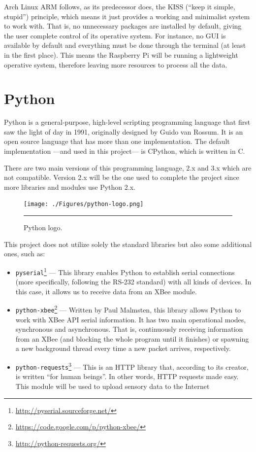 Arch Linux ARM follows, as its predecessor does, the KISS (``keep it simple, stupid'') principle, which means it just provides a working and minimalist system to work with. That is, no unnecessary packages are installed by default, giving the user complete control of its operative system. For instance, no GUI is available by default and everything must be done through the terminal (at least in the first place). This means the Raspberry Pi will be running a lightweight operative system, therefore leaving more resources to process all the data.


\section{Python}
\label{sec:whatispython}

Python is a general-purpose, high-level scripting programming language that first saw the light of day in 1991, originally designed by Guido van Rossum. It is an open source language that has more than one implementation. The default implementation ---and used in this project--- is CPython, which is written in C. 

There are two main versions of this programming language, 2.x and 3.x which are not compatible. Version 2.x will be the one used to complete the project since more libraries and modules use Python 2.x.

\begin{figure}[htbp]
    \centering
    \texttt{[image: ./Figures/python-logo.png]}
        \rule{35em}{0.5pt}
        \caption[Python logo]{Python logo.}
    \label{fig:pythonlogo}
\end{figure}

This project does not utilize solely the standard libraries but also some additional ones, such as:

\begin{itemize}
    \item \texttt{pyserial}\footnote{\url{http://pyserial.sourceforge.net/}} --- This library enables Python to establish serial connections (more specifically, following the RS-232 standard) with all kinds of devices. In this case, it allows us to receive data from an XBee\textregistered{} module.
    \item \texttt{python-xbee}\footnote{\url{https://code.google.com/p/python-xbee/}} --- Written by Paul Malmsten, this library allows Python to work with XBee API serial information. It has two main operational modes, synchronous and asynchronous. That is, continuously receiving information from an XBee\textregistered{} (and blocking the whole program until it finishes) or spawning a new background thread every time a new packet arrives, respectively.
    \item \texttt{python-requests}\footnote{\url{http://python-requests.org/}} --- This is an HTTP library that, according to its creator, is written ``for human beings''. In other words, HTTP requests made easy. This module will be used to upload sensory data to the Internet
\end{itemize}
